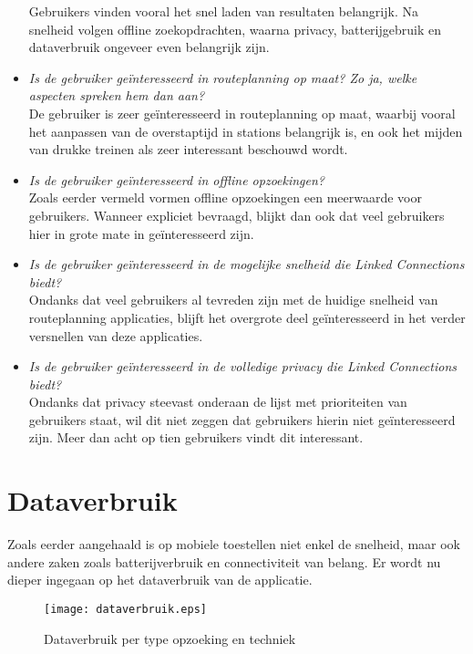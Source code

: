 \begin{itemize}
	Gebruikers vinden vooral het snel laden van resultaten belangrijk. Na snelheid volgen offline zoekopdrachten, waarna privacy, batterijgebruik en dataverbruik ongeveer even belangrijk zijn.
	\item \textit{Is de gebruiker geïnteresseerd in routeplanning op maat? Zo ja, welke aspecten spreken hem dan aan?}\\
	De gebruiker is zeer geïnteresseerd in routeplanning op maat, waarbij vooral het aanpassen van de overstaptijd in stations belangrijk is, en ook het mijden van drukke treinen als zeer interessant beschouwd wordt.
	\item \textit{Is de gebruiker geïnteresseerd in offline opzoekingen?}\\
	Zoals eerder vermeld vormen offline opzoekingen een meerwaarde voor gebruikers. Wanneer expliciet bevraagd, blijkt dan ook dat veel gebruikers hier in grote mate in geïnteresseerd zijn.
	\item \textit{Is de gebruiker geïnteresseerd in de mogelijke snelheid die Linked Connections biedt?}\\
	Ondanks dat veel gebruikers al tevreden zijn met de huidige snelheid van routeplanning applicaties, blijft het overgrote deel geïnteresseerd in het verder versnellen van deze applicaties.
	\item \textit{Is de gebruiker geïnteresseerd in de volledige privacy die Linked Connections biedt?}\\
	Ondanks dat privacy steevast onderaan de lijst met prioriteiten van gebruikers staat, wil dit niet zeggen dat gebruikers hierin niet geïnteresseerd zijn. Meer dan acht op tien gebruikers vindt dit interessant.
\end{itemize}

\section{Dataverbruik}
Zoals eerder aangehaald is op mobiele toestellen niet enkel de snelheid, maar ook andere zaken zoals batterijverbruik en connectiviteit van belang. Er wordt nu dieper ingegaan op het dataverbruik van de applicatie. 

\begin{figure}[ht]
	\centering
	\texttt{[image: dataverbruik.eps]}
	\caption[Dataverbruik per opzoeking]{Dataverbruik per type opzoeking en techniek}
	\label{fig:dataUsage}
\end{figure}

